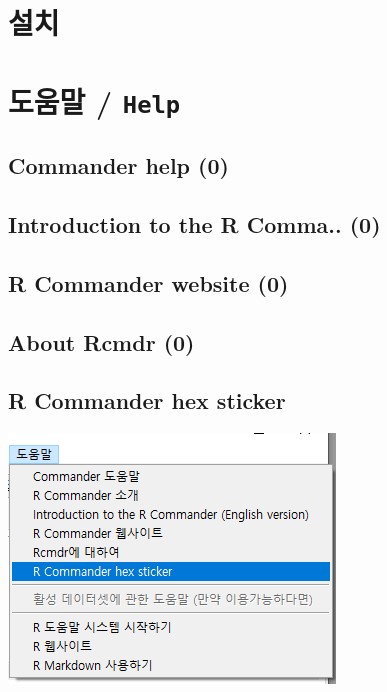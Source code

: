 \documentclass[
]{book}
\begin{document}
\hypertarget{install}{%
\chapter{설치}\label{install}}

\hypertarget{uxb3c4uxc6c0uxb9d0-help}{%
\chapter{\texorpdfstring{도움말 / \texttt{Help}}{도움말 / Help}}\label{uxb3c4uxc6c0uxb9d0-help}}

\hypertarget{commander-help-0}{%
\section{Commander help (0)}\label{commander-help-0}}

\hypertarget{introduction-to-the-r-comma..-0}{%
\section{Introduction to the R Comma.. (0)}\label{introduction-to-the-r-comma..-0}}

\hypertarget{r-commander-website-0}{%
\section{R Commander website (0)}\label{r-commander-website-0}}

\hypertarget{about-rcmdr-0}{%
\section{About Rcmdr (0)}\label{about-rcmdr-0}}

\hypertarget{r-commander-hex-sticker}{%
\section{R Commander hex sticker}\label{r-commander-hex-sticker}}

\includegraphics{fig/help-01.png}
\end{document}
